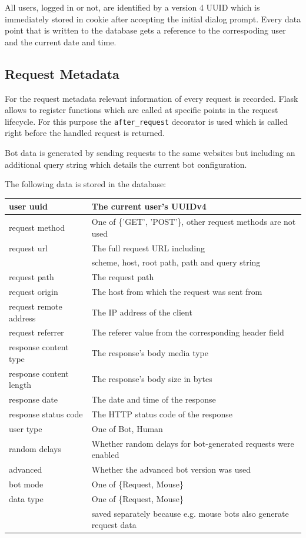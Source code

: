 \documentclass[
    fontsize=12pt,
    headings=small,
    parskip=half,           %
    bibliography=totoc,
    numbers=noenddot,       %
    open=any,               %
    final                   %
]{scrreprt}
\begin{document}
All users, logged in or not, are identified by a version 4 UUID which is immediately stored in cookie after accepting the initial dialog prompt. Every data point that is written to the database gets a reference to the correspoding user and the current date and time.

\subsection{Request Metadata}

For the request metadata relevant information of every request is recorded. Flask allows to register functions which are called at specific points in the request lifecycle. For this purpose the \lstinline{after_request} decorator is used which is called right before the handled request is returned.

Bot data is generated by sending requests to the same websites but including an additional query string which details the current bot configuration.

The following data is stored in the database:

\begin{table}[]
\begin{tabular}{|l|l|}
\hline
user uuid & The current user's UUIDv4 \\ \hline
request method & One of \{'GET', 'POST'\}, other request methods are not used \\ \hline
request url & The full request URL including \\ & scheme, host, root path, path and query string \\ \hline
request path & The request path \\ \hline
request origin & The host from which the request was sent from \\ \hline
request remote address & The IP address of the client \\ \hline
request referrer & The referer value from the corresponding header field \\ \hline
response content type & The response's body media type \\ \hline
response content length & The response's body size in bytes \\ \hline
response date & The date and time of the response \\ \hline
response status code & The HTTP status code of the response \\ \hline
user type & One of {Bot, Human} \\ \hline
random delays & Whether random delays for bot-generated requests were enabled \\ \hline
advanced & Whether the advanced bot version was used \\ \hline
bot mode & One of \{Request, Mouse\} \\ \hline
data type & One of \{Request, Mouse\} \\ & saved separately because e.g. mouse bots also generate request data \\ \hline

\end{tabular}
\end{table}
\end{document}
